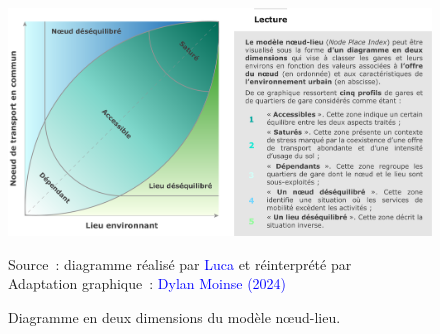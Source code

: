 \begin{refsegment}
    \begin{figure}[h!]\vspace*{4pt}
        \caption{Diagramme en deux dimensions du modèle nœud-lieu.}
        \label{fig-chap6:schema-theorique-NP}
        \centerline{\includegraphics[width=1\columnwidth]{src/Figures/Chap-6/FR_NPART_Diagramme_Bertolini.pdf}}
        \vspace{5pt}
        \begin{flushright}\scriptsize{
        Source~: diagramme réalisé par \textcolor{blue}{Luca} \textcolor{blue}{\textcite[202]{bertolini_spatial_1999}} et réinterprété par \textcolor{blue}{\textcite[243]{yang_tod_2021}}
        \\
        Adaptation graphique~: \textcolor{blue}{Dylan Moinse (2024)}
        }\end{flushright}
    \end{figure}


\end{refsegment}
